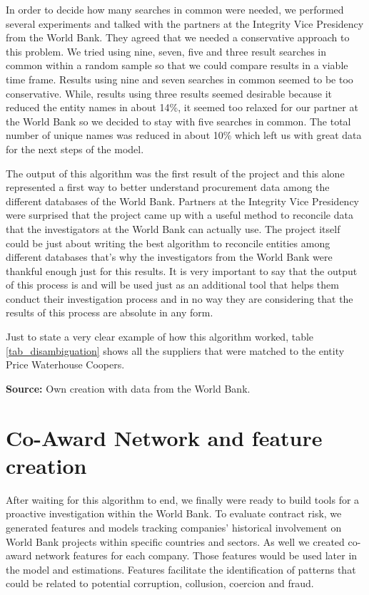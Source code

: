 In order to decide how many searches in common were needed, we performed several experiments and talked with the partners at the Integrity Vice Presidency from the World Bank. They agreed that we needed a conservative approach to this problem. We tried using  nine, seven, five and three result searches in common within a random sample so that we could compare results in a viable time frame. Results using nine and seven searches in common seemed to be too conservative. While, results using three results seemed desirable because it reduced the entity names in about 14\%, it seemed too relaxed for our partner at the World Bank so we decided to stay with five searches in common.  The total number of unique names was reduced in about 10\% which left us with great data for the next steps of the model.

The output of this algorithm was the first result of the project and this alone represented a first way to better understand procurement data among the different databases of the World Bank. Partners at the Integrity Vice Presidency were surprised that the project came up with a useful method to reconcile data that the investigators at the World Bank can actually use. The project itself could be just about writing the best algorithm to reconcile entities among different databases that's why the investigators from the World Bank were thankful enough just for this results. It is very important to say that the output of this process is and will be used just as an additional tool that helps them  conduct their investigation process and in no way they are considering that the results of this process are absolute in any form.

Just to state a very clear example of how this algorithm worked, table	\ref{tab_disambiguation} shows all the suppliers that were matched to the entity Price Waterhouse Coopers.


\noindent \footnotesize{\textbf{Source:} Own creation with data from the World Bank.}
\normalsize

\section{Co-Award Network and feature creation} \label{sec_features}


After waiting for this algorithm to end, we finally were ready to build tools for a proactive investigation within the World Bank. To evaluate contract risk, we generated features and models tracking companies' historical involvement on World Bank projects within specific countries and sectors. As well we created co-award network features for each company.  Those features would be used later in the model and estimations. Features facilitate the identification of patterns that could be related to potential corruption, collusion, coercion and fraud.

